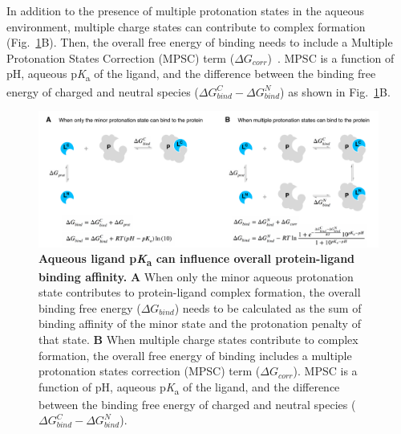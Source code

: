 \documentclass[9pt,lineno,final]{elife}
\newcommand{\pKa}{p\textit{K}\textsubscript{a}}
\begin{document}


In addition to the presence of multiple protonation states in the aqueous environment, multiple charge states can contribute to complex formation (Fig.~\ref{fig:pKa-effects-on-protein-ligand-binding}B). 
Then, the overall free energy of binding needs to include a Multiple Protonation States Correction (MPSC) term ($\Delta G_{corr}$)~\citep{deOliveira:2019:J.Chem.TheoryComput.}. 
MPSC is a function of pH, aqueous \pKa{} of the ligand, and the difference between the binding free energy of charged and neutral species ($\Delta G_{bind}^{C} - \Delta G_{bind}^{N}$) as shown in Fig.~\ref{fig:pKa-effects-on-protein-ligand-binding}B.




\begin{figure}[h]
\centering
\includegraphics[width=1.0\linewidth]{figures/pKa-effects-on-protein-ligand-binding.pdf}
\caption{ {\bf Aqueous ligand \pKa{} can influence overall protein-ligand binding affinity.} 
{\bf A} When only the minor aqueous protonation state contributes to protein-ligand complex formation, the overall binding free energy ($\Delta G_{bind}$) needs to be calculated as the sum of binding affinity of the minor state and the protonation penalty of that state. 
{\bf B} When multiple charge states contribute to complex formation, the overall free energy of binding includes a multiple protonation states correction (MPSC) term ($\Delta G_{corr}$). 
MPSC is a function of pH, aqueous \pKa{} of the ligand, and the difference between the binding free energy of charged and neutral species ($\Delta G_{bind}^{C} - \Delta G_{bind}^{N}$).
}
\label{fig:pKa-effects-on-protein-ligand-binding}
\end{figure}
\end{document}
